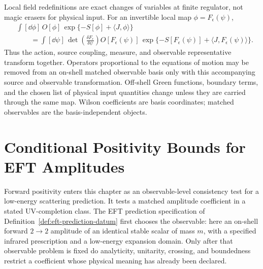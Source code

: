Local field redefinitions are exact changes of variables at finite regulator,
not magic erasers for physical input.  For an invertible local map
\(\phi=F_\epsilon(\psi)\),
\begin{equation}
\begin{aligned}
  &\int [\dd\phi]\,
    O[\phi]\,
    \exp\{-S[\phi]+\langle J,\phi\rangle\}      \\
  &\qquad =
    \int[\dd\psi]\,
    \det\!\left(\frac{\delta F_\epsilon}{\delta\psi}\right)
    O[F_\epsilon(\psi)]\,
    \exp\{-S[F_\epsilon(\psi)]
      +\langle J,F_\epsilon(\psi)\rangle\}.
\end{aligned}
  \label{eq:eft-field-redefinition-source-identity}
\end{equation}
Thus the action, source coupling, measure, and observable representative
transform together.  Operators proportional to the equations of motion may be
removed from an on-shell matched observable basis only with this accompanying
source and observable transformation.  Off-shell Green functions, boundary
terms, and the chosen list of physical input quantities change unless they
are carried through the same map.  Wilson coefficients are basis coordinates;
matched observables are the basis-independent objects.

\section{Conditional Positivity Bounds for EFT Amplitudes}
\label{sec:eft-conditional-positivity-bounds}

Forward positivity enters this chapter as an observable-level consistency test
for a low-energy scattering prediction.  It tests a matched amplitude
coefficient in a stated UV-completion class.  The EFT prediction specification
of Definition~\ref{def:eft-prediction-datum} first chooses the observable:
here an on-shell forward \(2\to2\) amplitude of an identical stable scalar of
mass \(m\), with a specified infrared prescription and a low-energy expansion
domain.  Only after that observable problem is fixed do analyticity, unitarity,
crossing, and boundedness restrict a coefficient whose physical meaning has
already been declared.

